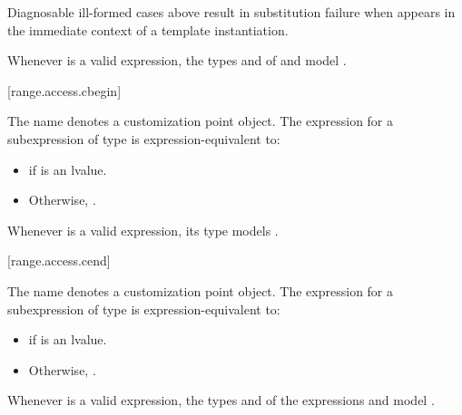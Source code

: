 \pnum
\begin{note}
Diagnosable ill-formed cases above
result in substitution failure when 
appears in the immediate context of a template instantiation.
\end{note}

\pnum
\begin{note}
Whenever  is a valid expression,
the types  and  of
 and 
model .
\end{note}

[range.access.cbegin]{}
%

\pnum
The name  denotes a customization point
object. The expression
 for a subexpression  of type 
is expression-equivalent to:
\begin{itemize}
\item {} if  is an lvalue.
\item Otherwise, .
\end{itemize}

\pnum
\begin{note}
Whenever  is a valid expression, its type models
.
\end{note}

[range.access.cend]{}
%

\pnum
The name  denotes a customization point
object. The expression
 for a subexpression  of type 
is expression-equivalent to:
\begin{itemize}
\item {} if  is an lvalue.
\item Otherwise, .
\end{itemize}

\pnum
\begin{note}
Whenever  is a valid expression,
the types  and  of the expressions
 and 
model .
\end{note}

